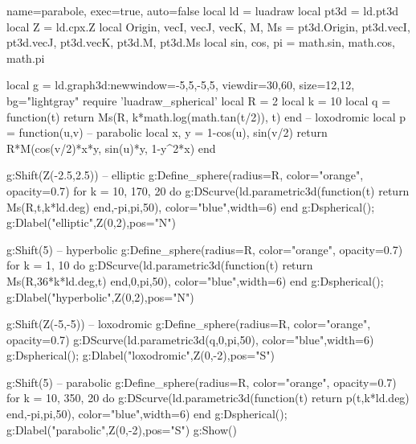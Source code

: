 \documentclass[border=5pt]{standalone}%
\begin{document}
\begin{luadraw}{name=parabole, exec=true, auto=false}
local ld = luadraw
local pt3d = ld.pt3d
local Z = ld.cpx.Z
local Origin, vecI, vecJ, vecK, M, Ms = pt3d.Origin, pt3d.vecI, pt3d.vecJ, pt3d.vecK, pt3d.M, pt3d.Ms
local sin, cos, pi = math.sin, math.cos, math.pi

local g = ld.graph3d:new{window={-5,5,-5,5}, viewdir={30,60}, 
    size={12,12}, bg="lightgray"}
require 'luadraw_spherical'
local R = 2
local k = 10
local q = function(t) return Ms(R, k*math.log(math.tan(t/2)), t) end -- loxodromic
local p = function(u,v) -- parabolic
    local x, y = 1-cos(u), sin(v/2)
    return R*M(cos(v/2)*x*y, sin(u)*y, 1-y^2*x)
end

g:Shift(Z(-2.5,2.5)) -- elliptic
g:Define_sphere({radius=R, color="orange", opacity=0.7})
for k = 10, 170, 20 do
    g:DScurve(ld.parametric3d(function(t) return Ms(R,t,k*ld.deg) end,-pi,pi,50), 
        {color="blue",width=6})
end
g:Dspherical(); g:Dlabel("elliptic",Z(0,2),{pos="N"})

g:Shift(5) -- hyperbolic
g:Define_sphere({radius=R, color="orange", opacity=0.7})
for k = 1, 10 do
    g:DScurve(ld.parametric3d(function(t) return Ms(R,36*k*ld.deg,t) end,0,pi,50), 
        {color="blue",width=6})
end
g:Dspherical(); g:Dlabel("hyperbolic",Z(0,2),{pos="N"})

g:Shift(Z(-5,-5)) -- loxodromic
g:Define_sphere({radius=R, color="orange", opacity=0.7})
g:DScurve(ld.parametric3d(q,0,pi,50), {color="blue",width=6})
g:Dspherical(); g:Dlabel("loxodromic",Z(0,-2),{pos="S"})

g:Shift(5) -- parabolic
g:Define_sphere({radius=R, color="orange", opacity=0.7})
for k = 10, 350, 20 do
    g:DScurve(ld.parametric3d(function(t) return p(t,k*ld.deg) end,-pi,pi,50), 
        {color="blue",width=6})
end
g:Dspherical(); g:Dlabel("parabolic",Z(0,-2),{pos="S"})
g:Show()
\end{luadraw}
\end{document}
